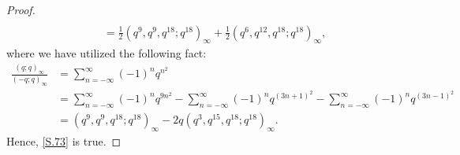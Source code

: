 \documentclass[reqno,12pt]{amsart}
\theoremstyle{remark}
\numberwithin{equation}{section}
\begin{document}
\begin{proof}
\begin{align}
\nonumber\\
&\quad=\frac{1}{2}\left(q^9,q^9,q^{18};q^{18}\right)_{\infty}
+\frac{1}{2}\left(q^6,q^{12},q^{18};q^{18}\right)_{\infty},
\end{align}
where we have utilized the following fact:
\begin{align}
\frac{\left(q;q\right)_{\infty}}{\left(-q;q\right)_{\infty}}
&=\sum_{n=-\infty}^{\infty}\left(-1\right)^nq^{n^2}\nonumber\\
&=\sum_{n=-\infty}^{\infty}\left(-1\right)^nq^{9n^2}
-\sum_{n=-\infty}^{\infty}\left(-1\right)^nq^{\left(3n+1\right)^2}
-\sum_{n=-\infty}^{\infty}\left(-1\right)^nq^{\left(3n-1\right)^2}\nonumber\\
&=\left(q^9,q^9,q^{18};q^{18}\right)_{\infty}
-2q\left(q^3,q^{15},q^{18};q^{18}\right)_{\infty}.\label{A8}
\end{align}
Hence, \eqref{S.73} is true.


\end{proof}
\end{document}
